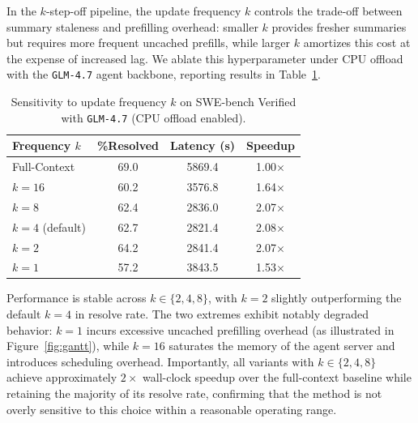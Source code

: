 In the $k$-step-off pipeline, the update frequency $k$ controls the trade-off between summary staleness and prefilling overhead: smaller $k$ provides fresher summaries but requires more frequent uncached prefills, while larger $k$ amortizes this cost at the expense of increased lag. We ablate this hyperparameter under CPU offload with the \texttt{GLM-4.7} agent backbone, reporting results in Table~\ref{tab:k_sensitivity}.

\begin{table}[t]
\centering
\setlength{\tabcolsep}{3.0pt}
\caption{Sensitivity to update frequency $k$ on SWE-bench Verified with \texttt{GLM-4.7} (CPU offload enabled).}
\label{tab:k_sensitivity}
\begin{tabular}{l c c c}
\toprule
Frequency $k$ & \%Resolved & Latency (s) & Speedup \\
\midrule
Full-Context & 69.0 & 5869.4 & 1.00$\times$ \\
\midrule
$k=16$ & 60.2 & 3576.8 & 1.64$\times$ \\
$k=8$ & 62.4 & 2836.0 & 2.07$\times$ \\
$k=4$ (default) & 62.7 & 2821.4 & 2.08$\times$ \\
$k=2$ & 64.2 & 2841.4 & 2.07$\times$ \\
$k=1$ & 57.2 & 3843.5 & 1.53$\times$ \\
\bottomrule
\end{tabular}
\vspace{-2mm}
\end{table}

Performance is stable across $k \in \{2, 4, 8\}$, with $k=2$ slightly outperforming the default $k=4$ in resolve rate. The two extremes exhibit notably degraded behavior: $k=1$ incurs excessive uncached prefilling overhead (as illustrated in Figure~\ref{fig:gantt}), while $k=16$ saturates the memory of the agent server and introduces scheduling overhead. Importantly, all {\model} variants with $k \in \{2, 4, 8\}$ achieve approximately $2\times$ wall-clock speedup over the full-context baseline while retaining the majority of its resolve rate, confirming that the method is not overly sensitive to this choice within a reasonable operating range.
